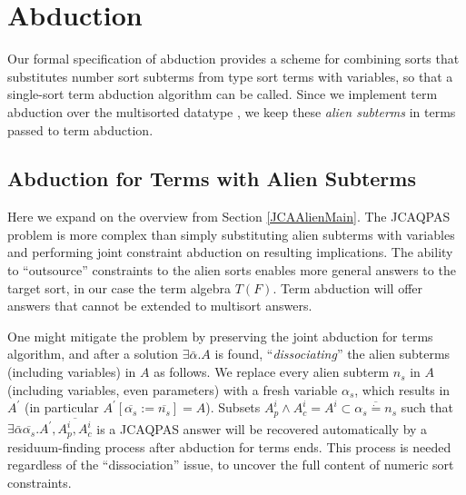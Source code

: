 \documentclass{article}
\newcommand{\assign}{:=}
\newcommand{\tmem}[1]{{\em #1\/}}
\newcommand{\tmverbatim}[1]{{\ttfamily{#1}}}
\begin{document}
\section{Abduction}

Our formal specification of abduction provides a scheme for combining sorts
that substitutes number sort subterms from type sort terms with variables, so
that a single-sort term abduction algorithm can be called. Since we implement
term abduction over the multisorted datatype \tmverbatim{typ}, we keep these
{\tmem{alien subterms}} in terms passed to term abduction.

\subsection{Abduction for Terms with Alien Subterms}\label{JCAAlienAlg}

Here we expand on the overview from Section \ref{JCAAlienMain}. The JCAQPAS
problem is more complex than simply substituting alien subterms with variables
and performing joint constraint abduction on resulting implications. The
ability to ``outsource'' constraints to the alien sorts enables more general
answers to the target sort, in our case the term algebra $T (F)$. Term
abduction will offer answers that cannot be extended to multisort answers.

One might mitigate the problem by preserving the joint abduction for terms
algorithm, and after a solution $\exists \bar{\alpha} .A$ is found,
``{\tmem{dissociating}}'' the alien subterms (including variables) in $A$ as
follows. We replace every alien subterm $n_s$ in $A$ (including variables,
even parameters) with a fresh variable $\alpha_s$, which results in
$A^{\prime}$ (in particular $A^{\prime} [\overline{\alpha_s} \assign
\overline{n_s}] = A$). Subsets $A^i_p \wedge A^i_c = A^i \subset
\overline{\alpha_s \dot{=} n_s}$ such that $\exists \bar{\alpha}
\overline{\alpha_s} .A^{\prime}, \overline{A^i_p, A^i_c}$ is a JCAQPAS answer
will be recovered automatically by a residuum-finding process after abduction
for terms ends. This process is needed regardless of the ``dissociation''
issue, to uncover the full content of numeric sort constraints.
\end{document}
